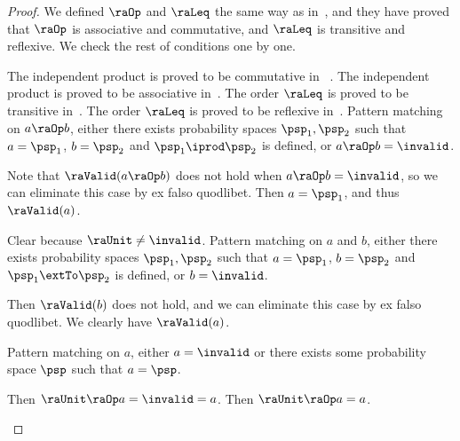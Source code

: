 \begin{proof}
We defined $\raOp$ and $\raLeq$ the same way as in~\cite{lilac},
  and they have proved that $\raOp$ is associative and commutative,
  and $\raLeq$ is transitive and reflexive.
  We check the rest of conditions one by one.
  \begin{induction}
    \step[Condition~$a \raOp b = b \raOp a$]
      The independent product is proved to be commutative in ~\cite{lilac}.
    \step[Condition~$(a \raOp b) \raOp c = a \raOp (b \raOp c)$]
      The independent product is proved to be associative in~\cite{lilac}.
      The order $\raLeq$ is proved to be transitive in~\cite{lilac}.
      The order $\raLeq$ is proved to be reflexive in~\cite{lilac}.
      Pattern matching on $a \raOp b$,
      either there exists probability spaces $\psp_1, \psp_2$ such that
      $a = \psp_1$, $b = \psp_2$ and $\psp_1 \iprod \psp_2$ is defined,
      or $a \raOp b = \invalid$.
\begin{casesplit}
        \case[$a \raOp b = \invalid$] Note that
        $\raValid(a \raOp b)$ does not hold when $a \raOp b = \invalid$,
      so we can eliminate this case by ex falso quodlibet.
      \case[$a \raOp b = \psp_1 \iprod \psp_2$] Then
      $a = \psp_1$, and thus $\raValid(a)$.
      \end{casesplit}

      Clear because $\raUnit \neq \invalid$.
      Pattern matching on $a$ and $b$,
      either there exists probability spaces $\psp_1, \psp_2$ such that
      $a = \psp_1$, $b = \psp_2$ and $\psp_1 \extTo \psp_2$ is defined,
      or $b = \invalid$.
      \begin{casesplit}
        \case[$b = \invalid$] Then $\raValid(b)$ does not hold,
      and we can eliminate this case by ex falso quodlibet.
        \case[$a = \psp_1$, $b = \psp_2$ and
        $\psp_1 \extTo \psp_2$]  We clearly have $\raValid(a)$.
      \end{casesplit}

    \step[Condition~$\raUnit \raOp a = a$]
      Pattern matching on $a$,
      either $a = \invalid$
      or there exists some probability space $\psp$ such that $a = \psp$.
      \begin{casesplit}
        \case[$a = \invalid$] Then $\raUnit \raOp a = \invalid = a$.
        \case[$a = \psp$] Then $\raUnit \raOp a = a$.
      \end{casesplit}


\end{induction}
\end{proof}
